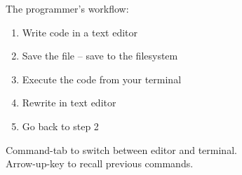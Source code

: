 \documentclass[xcolor=dvipsnames,compress,12pt]{beamer}
\begin{document}
\begin{frame}{The programmer's workflow:}
\Large
\begin{enumerate}
    \item Write code in a text editor
    \item Save the file -- save to the filesystem
    \item Execute the code from your terminal
    \item Rewrite in text editor
    \item Go back to step 2
\end{enumerate}
{\large
Command-tab to switch between editor and terminal.\\
Arrow-up-key to recall previous commands.
}
\end{frame}
\end{document}
